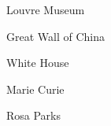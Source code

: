 \begin{figure*}[]
\centering
\tiny
\begin{minipage}[t]{.025\textwidth}
     \vspace{0pt}
\end{minipage}%
\hspace{1ex}%
\begin{minipage}[t]{0.98\textwidth}
    \vspace{0pt}
    \begin{minipage}[t]{0.2\textwidth}
        \centering
        Louvre Museum
    \end{minipage}%
    \begin{minipage}[t]{0.2\textwidth}
        \centering
        Great Wall of China
    \end{minipage}%
    \begin{minipage}[t]{0.2\textwidth}
        \centering
        White House
    \end{minipage}%
    \begin{minipage}[t]{0.2\textwidth}
        \centering
        Marie Curie
    \end{minipage}%
    \begin{minipage}[t]{0.2\textwidth}
        \centering
        Rosa Parks
    \end{minipage}%
\end{minipage}



\end{figure*}
